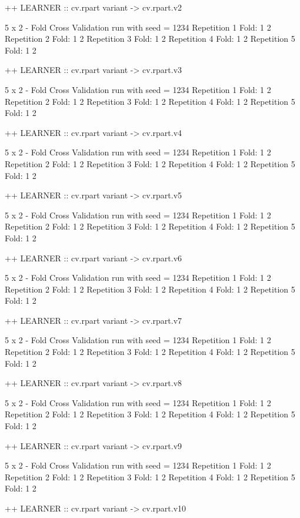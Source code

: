 \documentclass{article}
\begin{document}
\begin{Schunk}
\begin{Soutput}
++ LEARNER :: cv.rpart  variant ->  cv.rpart.v2 

 5 x 2 - Fold Cross Validation run with seed =  1234 
Repetition  1 
Fold:  1  2
Repetition  2 
Fold:  1  2
Repetition  3 
Fold:  1  2
Repetition  4 
Fold:  1  2
Repetition  5 
Fold:  1  2


++ LEARNER :: cv.rpart  variant ->  cv.rpart.v3 

 5 x 2 - Fold Cross Validation run with seed =  1234 
Repetition  1 
Fold:  1  2
Repetition  2 
Fold:  1  2
Repetition  3 
Fold:  1  2
Repetition  4 
Fold:  1  2
Repetition  5 
Fold:  1  2


++ LEARNER :: cv.rpart  variant ->  cv.rpart.v4 

 5 x 2 - Fold Cross Validation run with seed =  1234 
Repetition  1 
Fold:  1  2
Repetition  2 
Fold:  1  2
Repetition  3 
Fold:  1  2
Repetition  4 
Fold:  1  2
Repetition  5 
Fold:  1  2


++ LEARNER :: cv.rpart  variant ->  cv.rpart.v5 

 5 x 2 - Fold Cross Validation run with seed =  1234 
Repetition  1 
Fold:  1  2
Repetition  2 
Fold:  1  2
Repetition  3 
Fold:  1  2
Repetition  4 
Fold:  1  2
Repetition  5 
Fold:  1  2


++ LEARNER :: cv.rpart  variant ->  cv.rpart.v6 

 5 x 2 - Fold Cross Validation run with seed =  1234 
Repetition  1 
Fold:  1  2
Repetition  2 
Fold:  1  2
Repetition  3 
Fold:  1  2
Repetition  4 
Fold:  1  2
Repetition  5 
Fold:  1  2


++ LEARNER :: cv.rpart  variant ->  cv.rpart.v7 

 5 x 2 - Fold Cross Validation run with seed =  1234 
Repetition  1 
Fold:  1  2
Repetition  2 
Fold:  1  2
Repetition  3 
Fold:  1  2
Repetition  4 
Fold:  1  2
Repetition  5 
Fold:  1  2


++ LEARNER :: cv.rpart  variant ->  cv.rpart.v8 

 5 x 2 - Fold Cross Validation run with seed =  1234 
Repetition  1 
Fold:  1  2
Repetition  2 
Fold:  1  2
Repetition  3 
Fold:  1  2
Repetition  4 
Fold:  1  2
Repetition  5 
Fold:  1  2


++ LEARNER :: cv.rpart  variant ->  cv.rpart.v9 

 5 x 2 - Fold Cross Validation run with seed =  1234 
Repetition  1 
Fold:  1  2
Repetition  2 
Fold:  1  2
Repetition  3 
Fold:  1  2
Repetition  4 
Fold:  1  2
Repetition  5 
Fold:  1  2


++ LEARNER :: cv.rpart  variant ->  cv.rpart.v10 


\end{Soutput}
\end{Schunk}
\end{document}
